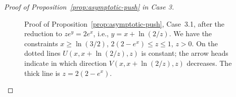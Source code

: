 \documentclass[a4paper]{amsart} %
\theoremstyle{definition}
\theoremstyle{remark}
\numberwithin{equation}{section}
\newcommand*{\XXXasymptoticDenominator}{V}
\newcommand*{\XXXasymptoticNominator}{U}
\begin{document}
\begin{proof}[Proof of Proposition~\ref{prop:asymptotic-push} in Case 3]
\begin{figure}[b]
	\caption{%
		Proof of Proposition~\ref{prop:asymptotic-push}, Case~3.1, after the reduction to $ze^y = 2e^x$,
		i.e., $y = x + \ln(2/z)$. We have the constraints $x\geq \ln(3/2)$, $2(2-e^x) \leq z \leq 1$, $z>0$.
				On the dotted lines 
				$\XXXasymptoticNominator(x,x + \ln(2/z), z)$ is constant;
				the arrow heads indicate in which direction 
			$\XXXasymptoticDenominator(x,x + \ln(2/z), z)$ decreases.
			The thick line is $z = 2(2-e^x)$. 
	}
	\label{fig:asymptotic-case-3.1-no-y}
\end{figure}


\end{proof}
\end{document}
